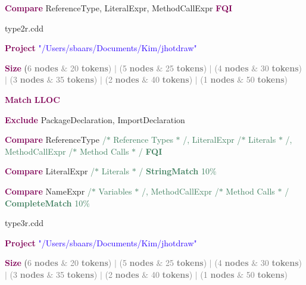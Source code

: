 \documentclass[sigplan,10pt,review,anonymous]{acmart}
\begin{document}
\textbf{\textcolor[HTML]{7F0055}{Compare}} ReferenceType, LiteralExpr, MethodCallExpr \textbf{\textcolor[HTML]{7F0055}{FQI}}\par


\vspace{\baselineskip}
type2r.cdd\par

\textbf{\textcolor[HTML]{7F0055}{Project}} \textcolor[HTML]{2A00FF}{"/Users/sbaars/Documents/Kim/jhotdraw"}\par

\textbf{\textcolor[HTML]{7F0055}{Size}} (\textcolor[HTML]{7D7D7D}{6 \textbf{nodes} $\&$  20 \textbf{tokens}) $ \vert $  (5 \textbf{nodes} $\&$  25 \textbf{tokens}) $ \vert $  (4 \textbf{nodes} $\&$  30 \textbf{tokens}) $ \vert $  (3 \textbf{nodes} $\&$  35 \textbf{tokens}) $ \vert $  (2 \textbf{nodes} $\&$  40 \textbf{tokens}) $ \vert $  (1 \textbf{nodes} $\&$  50 \textbf{tokens})}\par

\textbf{\textcolor[HTML]{7F0055}{Match}} \textbf{\textcolor[HTML]{7F0055}{LLOC}}\par

\textbf{\textcolor[HTML]{7F0055}{Exclude}} PackageDeclaration, ImportDeclaration\par

\textbf{\textcolor[HTML]{7F0055}{Compare}} ReferenceType \textcolor[HTML]{3F7F5F}{/$\ast$  Reference Types $\ast$ /, LiteralExpr /$\ast$  Literals $\ast$ /, MethodCallExpr /$\ast$  Method Calls $\ast$ / \textbf{FQI}}\par

\textbf{\textcolor[HTML]{7F0055}{Compare}} LiteralExpr \textcolor[HTML]{3F7F5F}{/$\ast$  Literals $\ast$ / \textbf{StringMatch} 10$\%$ }\par

\textbf{\textcolor[HTML]{7F0055}{Compare}} NameExpr \textcolor[HTML]{3F7F5F}{/$\ast$  Variables $\ast$ /, MethodCallExpr /$\ast$  Method Calls $\ast$ / \textbf{CompleteMatch} 10$\%$ }\par



\vspace{\baselineskip}
type3r.cdd\par

\textbf{\textcolor[HTML]{7F0055}{Project}} \textcolor[HTML]{2A00FF}{"/Users/sbaars/Documents/Kim/jhotdraw"}\par

\textbf{\textcolor[HTML]{7F0055}{Size}} (\textcolor[HTML]{7D7D7D}{6 \textbf{nodes} $\&$  20 \textbf{tokens}) $ \vert $  (5 \textbf{nodes} $\&$  25 \textbf{tokens}) $ \vert $  (4 \textbf{nodes} $\&$  30 \textbf{tokens}) $ \vert $  (3 \textbf{nodes} $\&$  35 \textbf{tokens}) $ \vert $  (2 \textbf{nodes} $\&$  40 \textbf{tokens}) $ \vert $  (1 \textbf{nodes} $\&$  50 \textbf{tokens})}\par
\end{document}
